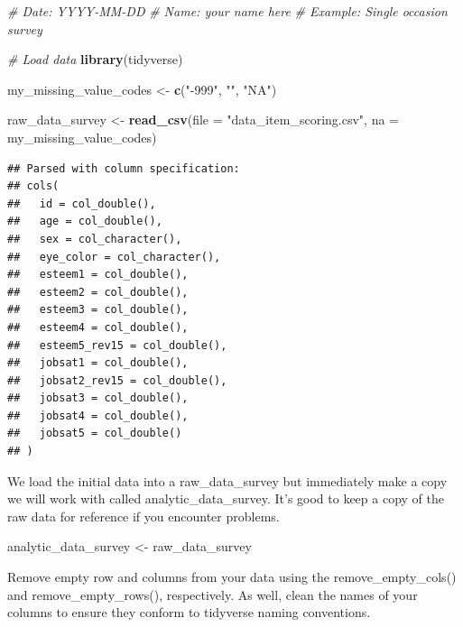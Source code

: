 \documentclass[
]{krantz}
\makeatletter
\newenvironment{Shaded}{\begin{snugshade}}{\end{snugshade}}
\newcommand{\CommentTok}[1]{\textcolor[rgb]{0.37,0.37,0.37}{\textit{#1}}}
\newcommand{\DataTypeTok}[1]{\textcolor[rgb]{0.27,0.27,0.27}{#1}}
\newcommand{\KeywordTok}[1]{\textcolor[rgb]{0.27,0.27,0.27}{\textbf{#1}}}
\newcommand{\NormalTok}[1]{#1}
\newcommand{\OperatorTok}[1]{\textcolor[rgb]{0.43,0.43,0.43}{\textbf{#1}}}
\newcommand{\StringTok}[1]{\textcolor[rgb]{0.5,0.5,0.5}{#1}}
\newenvironment{kframe}{%
\medskip{}
\setlength{\fboxsep}{.8em}
 \def\at@end@of@kframe{}%
 \ifinner\ifhmode%
  \def\at@end@of@kframe{\end{minipage}}%
  \begin{minipage}{\columnwidth}%
 \fi\fi%
 \def\FrameCommand##1{\hskip\@totalleftmargin \hskip-\fboxsep
 \colorbox{shadecolor}{##1}\hskip-\fboxsep
     \hskip-\linewidth \hskip-\@totalleftmargin \hskip\columnwidth}%
 \MakeFramed {\advance\hsize-\width
   \@totalleftmargin\z@ \linewidth\hsize
   \@setminipage}}%
 {\par\unskip\endMakeFramed%
 \at@end@of@kframe}
\renewenvironment{Shaded}{\begin{kframe}}{\end{kframe}}
\makeatother
\begin{document}
\begin{Shaded}
\begin{Highlighting}[]
\CommentTok{# Date: YYYY-MM-DD}
\CommentTok{# Name: your name here}
\CommentTok{# Example: Single occasion survey}

\CommentTok{# Load data}
\KeywordTok{library}\NormalTok{(tidyverse)}

\NormalTok{my_missing_value_codes <-}\StringTok{ }\KeywordTok{c}\NormalTok{(}\StringTok{"-999"}\NormalTok{, }\StringTok{""}\NormalTok{, }\StringTok{"NA"}\NormalTok{)}

\NormalTok{raw_data_survey <-}\StringTok{ }\KeywordTok{read_csv}\NormalTok{(}\DataTypeTok{file =} \StringTok{"data_item_scoring.csv"}\NormalTok{,}
                     \DataTypeTok{na =}\NormalTok{ my_missing_value_codes)}
\end{Highlighting}
\end{Shaded}

\begin{verbatim}
## Parsed with column specification:
## cols(
##   id = col_double(),
##   age = col_double(),
##   sex = col_character(),
##   eye_color = col_character(),
##   esteem1 = col_double(),
##   esteem2 = col_double(),
##   esteem3 = col_double(),
##   esteem4 = col_double(),
##   esteem5_rev15 = col_double(),
##   jobsat1 = col_double(),
##   jobsat2_rev15 = col_double(),
##   jobsat3 = col_double(),
##   jobsat4 = col_double(),
##   jobsat5 = col_double()
## )
\end{verbatim}

We load the initial data into a raw\_data\_survey but immediately make a copy we will work with called analytic\_data\_survey. It's good to keep a copy of the raw data for reference if you encounter problems.

\begin{Shaded}
\begin{Highlighting}[]
\NormalTok{analytic_data_survey <-}\StringTok{ }\NormalTok{raw_data_survey}
\end{Highlighting}
\end{Shaded}

Remove empty row and columns from your data using the remove\_empty\_cols() and remove\_empty\_rows(), respectively. As well, clean the names of your columns to ensure they conform to tidyverse naming conventions.

\begin{Shaded}
\end{Shaded}
\end{document}

